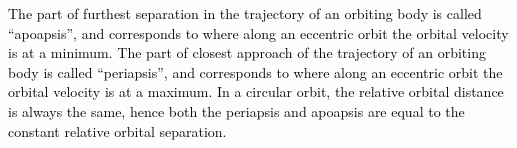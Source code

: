 \documentclass[main.tex]{subfiles}
\begin{document}
\begin{tcolorbox}[sharp corners, colback=red!30, colframe=red!80!blue, title=Box \refstepcounter{educhap3}\label{boxchap3:periapo}\ref{boxchap3:periapo} -- Periapsis and apoapsis]
\par \textcolor{black} { The part of furthest separation in the trajectory of an orbiting body is called ``apoapsis'', and corresponds to where along an eccentric orbit the orbital velocity is at a minimum. The part of closest approach of the trajectory of an orbiting body is called ``periapsis'', and corresponds to where along an eccentric orbit the orbital velocity is at a maximum. In a circular orbit, the relative orbital distance is always the same, hence both the periapsis and apoapsis are equal to the constant relative orbital separation. }
\end{tcolorbox}
\end{document}

